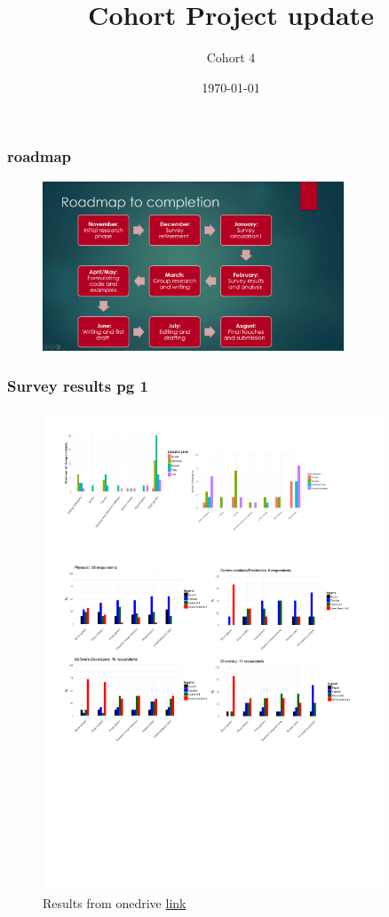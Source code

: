 \documentclass{beamer}
\title{Cohort Project update}
\author{Cohort 4}
\institute{Quantum Engineering CDT \\ University of Bristol}
\date{\today}
\begin{document}
\frame{\titlepage}

\begin{frame}
\frametitle{roadmap}
\begin{figure}[H]
\centering
\includegraphics[width=0.8\textwidth]{roadmap.png}
\caption{}
\end{figure}
\end{frame}



\begin{frame}
\frametitle{Survey results pg 1}
\begin{figure}[H]
	\centering
	\includegraphics[width=0.9\textwidth]{pg_0001.pdf}
	\caption{Results from onedrive \url{link}}
	\label{}
\end{figure}
\end{frame}
\end{document}
